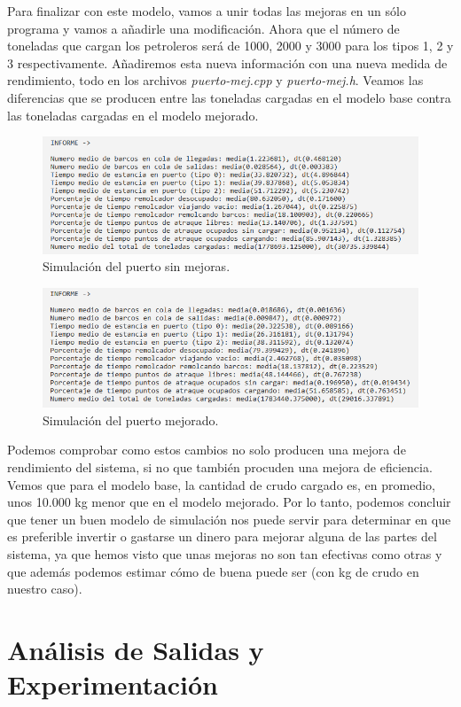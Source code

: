 \documentclass[11pt,a4paper]{report}
\begin{document}
Para finalizar con este modelo, vamos a unir todas las mejoras en un sólo programa y vamos a añadirle una modificación. Ahora que el número de toneladas que cargan los petroleros será
de 1000, 2000 y 3000 para los tipos 1, 2 y 3 respectivamente. Añadiremos esta nueva información con una nueva medida de rendimiento, todo en los archivos \textit{puerto-mej.cpp} y
\textit{puerto-mej.h}. Veamos las diferencias que se producen entre las toneladas cargadas en el modelo base contra las toneladas cargadas en el modelo mejorado.
\begin{figure}[H]
\centering
\includegraphics[scale=0.7]{img/puerto-mej1.png}
\caption{Simulación del puerto sin mejoras.}
\end{figure}
\begin{figure}[H]
\centering
\includegraphics[scale=0.7]{img/puerto-mej2.png}
\caption{Simulación del puerto mejorado.}
\end{figure}

Podemos comprobar como estos cambios no solo producen una mejora de rendimiento del sistema, si no que también procuden una mejora de eficiencia. Vemos que para el modelo base, la
cantidad de crudo cargado es, en promedio, unos 10.000 kg menor que en el modelo mejorado. Por lo tanto, podemos concluir que tener un buen modelo de simulación nos puede servir
para determinar en que es preferible invertir o gastarse un dinero para mejorar alguna de las partes del sistema, ya que hemos visto que unas mejoras no son tan efectivas como otras
y que además podemos estimar cómo de buena puede ser (con kg de crudo en nuestro caso).



\chapter{Análisis de Salidas y Experimentación}
\end{document}
